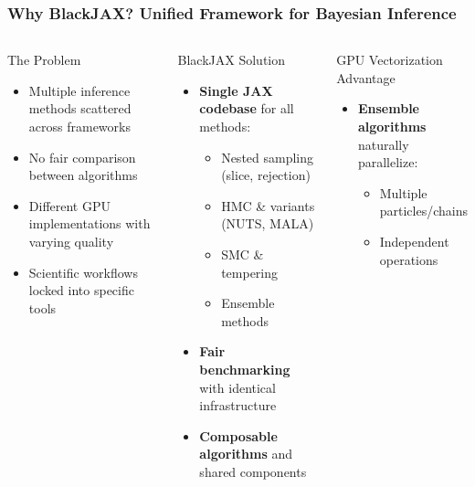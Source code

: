 \documentclass[aspectratio=169]{beamer}
\begin{document}
\begin{frame}
    \frametitle{Why BlackJAX? Unified Framework for Bayesian Inference}
    \begin{columns}
        \begin{block}{The Problem}
            \begin{itemize}
                \item Multiple inference methods scattered across frameworks
                \item No fair comparison between algorithms
                \item Different GPU implementations with varying quality
                \item Scientific workflows locked into specific tools
            \end{itemize}
        \end{block}
        \begin{block}{BlackJAX Solution}
            \begin{itemize}
                \item \textbf{Single JAX codebase} for all methods:
                    \begin{itemize}
                        \item Nested sampling (slice, rejection)
                        \item HMC \& variants (NUTS, MALA)
                        \item SMC \& tempering
                        \item Ensemble methods
                    \end{itemize}
                \item \textbf{Fair benchmarking} with identical infrastructure
                \item \textbf{Composable algorithms} and shared components
            \end{itemize}
        \end{block}
        \begin{block}{GPU Vectorization Advantage}
            \begin{itemize}
                \item \textbf{Ensemble algorithms} naturally parallelize:
                    \begin{itemize}
                        \item Multiple particles/chains
                        \item Independent operations

\end{itemize}
\end{itemize}
\end{block}
\end{columns}
\end{frame}
\end{document}
